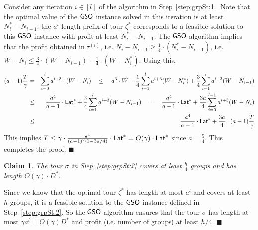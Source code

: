 \documentclass[11pt]{article}
\newtheorem{claim}[thm]{Claim}
\def\lat{{\sf Lat}\xspace}
\def\gso{\ensuremath{{\sf GSO}}\xspace}
\newenvironment{pf}{

\noindent{\bf Proof:}} {\hfill$\blacksquare$


}
\begin{document}
\begin{pf}
  Consider any iteration $i\in [l]$ of the algorithm in
  Step~\ref{step:grpSt:1}. Note that the optimal value of the \gso
  instance solved in this iteration is at least $N^*_i-N_{i-1}$: the
  $ a^i$ length prefix of tour $\zeta^*$ corresponds to a feasible
  solution to this \gso instance with profit at least $N^*_i-N_{i-1}$. The \gso algorithm implies
  that the profit obtained in $\tau^{(i)}$, i.e.  $N_i-N_{i-1}\ge
  \frac14\cdot (N^*_i-N_{i-1})$, i.e. $W-N_i\le \frac34\cdot (W-N_{i-1})
  + \frac14 \cdot (W-N^*_i)$. Using this,
  \begin{eqnarray*}
    ( a-1)\frac{T}{\gamma}  &= &\sum_{i=0}^l  a^{i+3}\cdot (W-N_i) \quad \le \quad  a^3\cdot W + \frac14 \sum_{i=1}^l  a^{i+3} (W-N^*_{i})+ \frac34
    \sum_{i=1}^l  a^{i+3} (W-N_{i-1}) \\
&\le &\frac{ a^4}{ a-1} \cdot \lat^* + \frac34 \sum_{i=1}^l  a^{i+3} (W-N_{i-1}) \quad = \quad \frac{ a^4}{ a-1} \cdot \lat^* + \frac{3 a}4 \sum_{i=0}^{l-1}  a^{i+3} (W-N_{i}) \\
    &\le &\frac{ a^4}{ a-1} \cdot \lat^* + \frac{3 a}4 \cdot ( a-1)\frac{T}\gamma
  \end{eqnarray*}
This implies $T\le \gamma\cdot \frac{ a^4}{( a-1)^2(1-3 a/4)}\cdot \lat^*=O(\gamma)\cdot \lat^*$
since $ a=\frac54$. This completes the proof.
\end{pf}

\begin{claim}\label{cl:lat-gst-2}
  The tour $\sigma$ in Step~\ref{step:grpSt:2} covers at least
  $\frac{h}{4}$ groups and has length $O(\gamma)\cdot D^*$.
\end{claim}
\begin{pf}
  Since we know that the optimal tour $\zeta^*$ has length at most
  $ a^l$ and covers at least $h$ groups, it is a feasible solution to
  the \gso instance defined in Step~\ref{step:grpSt:2}. So the \gso algorithm 
  ensures that the tour $\sigma$ has length at most $\gamma  a^l =
  O(\gamma) D^*$ and profit (i.e. number of groups) at least $h/4$. 
\end{pf}
\end{document}
